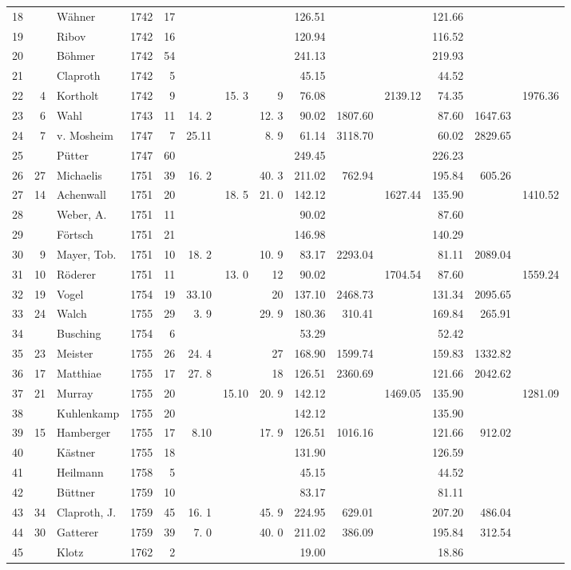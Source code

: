 \begin{center}
\begin{tabular}{|r|r|l|r|r|r|r|r|r|r|r|r|r|r|}
18&&Wähner&1742&17&&&&126.51&&&121.66&&\\
19&&Ribov&1742&16&&&&120.94&&&116.52&&\\
20&&Böhmer&1742&54&&&&241.13&&&219.93&&\\[3pt]
21&&Claproth&1742&5&&&&45.15&&&44.52&&\\
22&4&Kortholt&1742&9&&15. 3&9&76.08&&2139.12&74.35&&1976.36\\
23&6&Wahl&1743&11&14. 2&&12. 3&90.02&1807.60&&87.60&1647.63&\\
24&7&v. Mosheim&1747&7&25.11&&8. 9&61.14&3118.70&&60.02&2829.65&\\
25&&Pütter&1747&60&&&&249.45&&&226.23&&\\
26&27&Michaelis&1751&39&16. 2&&40. 3&211.02&762.94&&195.84&605.26&\\
27&14&Achenwall&1751&20&&18. 5&21. 0&142.12&&1627.44&135.90&&1410.52\\
28&&Weber, A.&1751&11&&&&90.02&&&87.60&&\\
29&&Förtsch&1751&21&&&&146.98&&&140.29&&\\
30&9&Mayer, Tob.&1751&10&18. 2&&10. 9&83.17&2293.04&&81.11&2089.04&\\[3pt]
31&10&Röderer&1751&11&&13. 0&12&90.02&&1704.54&87.60&&1559.24\\
32&19&Vogel&1754&19&33.10&&20&137.10&2468.73&&131.34&2095.65&\\
33&24&Walch&1755&29&3. 9&&29. 9&180.36&310.41&&169.84&265.91&\\
34&&Busching&1754&6&&&&53.29&&&52.42&&\\
35&23&Meister&1755&26&24. 4&&27&168.90&1599.74&&159.83&1332.82&\\
36&17&Matthiae&1755&17&27. 8&&18&126.51&2360.69&&121.66&2042.62&\\
37&21&Murray&1755&20&&15.10&20. 9&142.12&&1469.05&135.90&&1281.09\\
38&&Kuhlenkamp&1755&20&&&&142.12&&&135.90&&\\
39&15&Hamberger&1755&17&8.10&&17. 9&126.51&1016.16&&121.66&912.02&\\
40&&Kästner&1755&18&&&&131.90&&&126.59&&\\[3pt]
41&&Heilmann&1758&5&&&&45.15&&&44.52&&\\
42&&Büttner&1759&10&&&&83.17&&&81.11&&\\
43&34&Claproth, J.&1759&45&16. 1&&45. 9&224.95&629.01&&207.20&486.04&\\
44&30&Gatterer&1759&39&7. 0&&40. 0&211.02&386.09&&195.84&312.54&\\
45&&Klotz&1762&2&&&&19.00&&&18.86&&\\\hline
\end{tabular}
\end{center}
